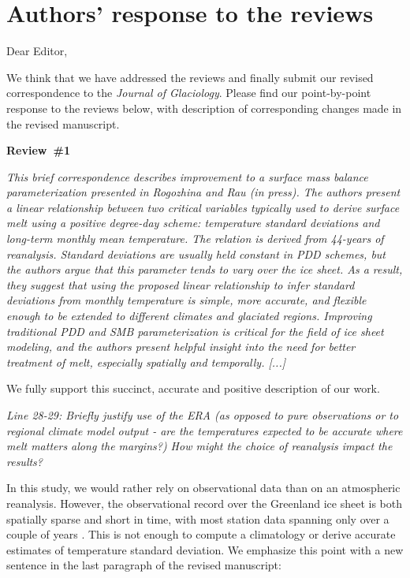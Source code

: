 \documentclass[10pt]{article}
\def\referee#1{\bigskip\textcolor{blue!50!black}{\textit{#1}}}
\begin{document}
\section*{Authors' response to the reviews}

Dear Editor,

We think that we have addressed the reviews and finally submit our revised correspondence to the \textit{Journal of Glaciology}. Please find our point-by-point response to the reviews below, with description of corresponding changes made in the revised manuscript.


\bigskip
\textbf{Review~{\#}1}

\referee{This brief correspondence describes improvement to a surface mass balance parameterization presented in Rogozhina and Rau (in  press). The authors present a linear relationship between two critical variables typically used to derive surface melt using a positive degree-day scheme: temperature standard deviations and long-term monthly mean temperature. The relation is derived from 44-years of reanalysis. Standard deviations are usually held constant in PDD schemes, but the authors argue that this parameter tends to vary over the ice sheet. As a result, they suggest that using the proposed linear relationship to infer standard deviations from monthly temperature is simple, more accurate, and flexible enough to be extended to different climates and glaciated regions. Improving traditional PDD and SMB parameterization is critical for the field of ice sheet modeling, and the authors present helpful insight into the need for better treatment of melt, especially spatially and temporally. [...]}

We fully support this succinct, accurate and positive description of our work.



\referee{Line 28-29: Briefly justify use of the ERA (as opposed to pure observations or to regional climate model output - are the temperatures expected to be accurate where melt matters along the margins?) How might the choice of reanalysis impact the results?}

In this study, we would rather rely on observational data than on an atmospheric reanalysis. However, the observational record over the Greenland ice sheet is both spatially sparse and short in time, with most station data spanning only over a couple of years \citep[see e.g.~][]{fausto-etal-2011}. This is not enough to compute a climatology or derive accurate estimates of temperature standard deviation. We emphasize this point with a new sentence in the last paragraph of the revised manuscript:
\end{document}
